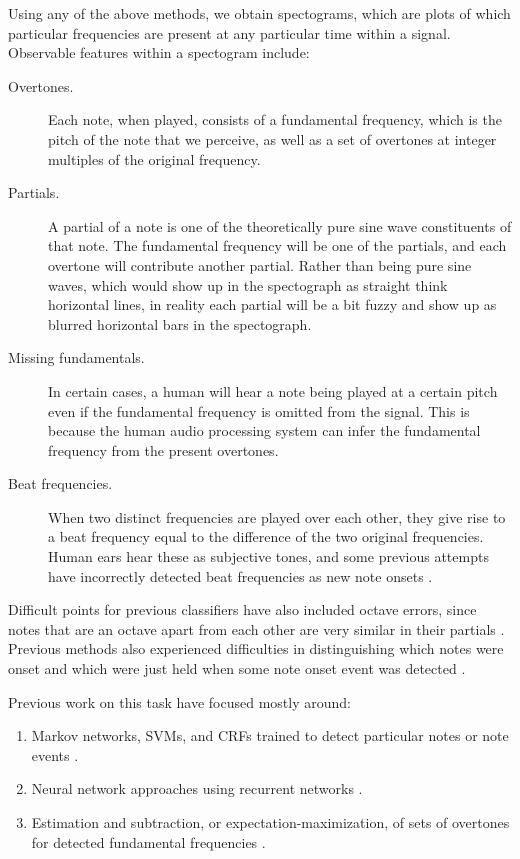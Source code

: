 \documentclass{article}
\begin{document}
Using any of the above methods, we obtain spectograms, which are plots of which
particular frequencies are present at any particular time within a signal.
Observable features within a spectogram include:
\begin{description}
\item[Overtones.]
  Each note, when played, consists of a fundamental frequency, which is the
  pitch of the note that we perceive, as well as a set of overtones at
  integer multiples of the original frequency.
\item[Partials.]
  A partial of a note is one of the theoretically pure sine wave constituents of
  that note. The fundamental frequency will be one of the partials, and each
  overtone will contribute another partial. Rather than being pure sine waves,
  which would show up in the spectograph as straight think horizontal lines, in
  reality each partial will be a bit fuzzy and show up as blurred horizontal
  bars in the spectograph.
\item[Missing fundamentals.] 
  In certain cases, a human will hear a note being played at a certain pitch
  even if the fundamental frequency is omitted from the signal. This is because
  the human audio processing system can infer the fundamental frequency from
  the present overtones. 
\item[Beat frequencies.]
  When two distinct frequencies are played over each other, they give rise to
  a beat frequency equal to the difference of the two original frequencies.
  Human ears hear these as subjective tones, and some previous attempts have
  incorrectly detected beat frequencies as new note onsets
  \cite{marolt2004connectionist}. 
\end{description}

Difficult points for previous classifiers have also included octave errors,
since notes that are an octave apart from each other are very similar in
their partials \cite{bock2012polyphonic} \cite{poliner2006discriminative}.
Previous methods also experienced
difficulties in distinguishing which notes were onset and which were just held
when some note onset event was detected \cite{marolt2004connectionist}.

Previous work on this task have focused mostly around:
\begin{enumerate}
\item Markov networks, SVMs, and CRFs trained to detect particular notes or
  note events
  \cite{ryynanen2005polyphonic} \cite{poliner2006discriminative}
  \cite{gang2009polyphonic}.
\item Neural network approaches using recurrent networks
  \cite{marolt2004connectionist} \cite{bock2012polyphonic}.
\item Estimation and subtraction, or expectation-maximization, of sets of
  overtones for detected fundamental frequencies
  \cite{5946322} \cite{}.
\end{enumerate}
\end{document}
